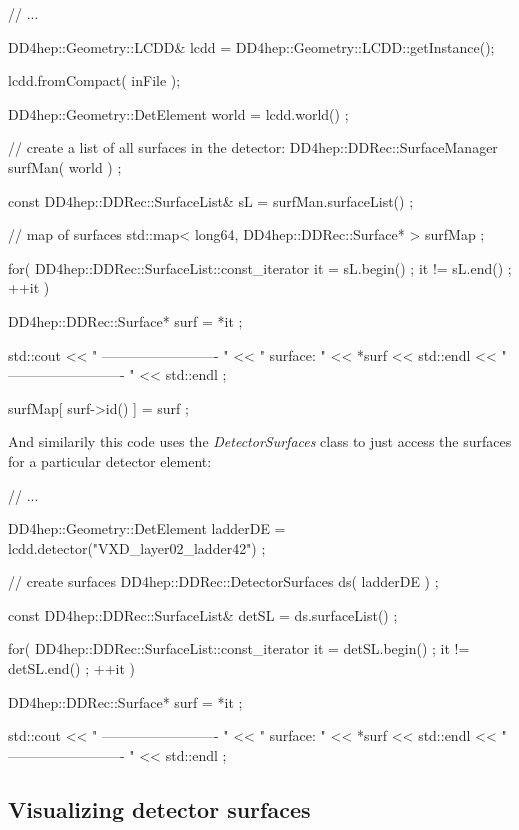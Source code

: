 \documentclass[10pt,a4paper]{article}
\begin{document}
\begin{code}
  // ...

  DD4hep::Geometry::LCDD& lcdd = DD4hep::Geometry::LCDD::getInstance();

  lcdd.fromCompact( inFile );

  DD4hep::Geometry::DetElement world = lcdd.world() ;

  // create a list of all surfaces in the detector:
  DD4hep::DDRec::SurfaceManager surfMan(  world ) ;

  const DD4hep::DDRec::SurfaceList& sL = surfMan.surfaceList() ;

  // map of surfaces
  std::map< long64, DD4hep::DDRec::Surface* > surfMap ;

  for( DD4hep::DDRec::SurfaceList::const_iterator it = sL.begin() ; it != sL.end() ; ++it ){
    
    DD4hep::DDRec::Surface* surf =  *it ;
    
    std::cout << " ------------------------- " 
      	      << " surface: "  << *surf         << std::endl
      	      << " ------------------------- "  << std::endl ;
    
    surfMap[ surf->id() ] = surf ;
  }

\end{code}

\noindent
And similarily this code uses the {\em DetectorSurfaces} class to just access the surfaces 
for a particular detector element:

\begin{code}
  // ...

  DD4hep::Geometry::DetElement ladderDE = lcdd.detector("VXD_layer02_ladder42") ;

  // create surfaces
  DD4hep::DDRec::DetectorSurfaces ds( ladderDE ) ;

  const DD4hep::DDRec::SurfaceList& detSL = ds.surfaceList() ;

  for( DD4hep::DDRec::SurfaceList::const_iterator it = detSL.begin() ; it != detSL.end() ; ++it ){

    DD4hep::DDRec::Surface* surf =  *it ;

    std::cout << " ------------------------- " 
      	      << " surface: "  << *surf         << std::endl
      	      << " ------------------------- "  << std::endl ;
  }
\end{code}

\subsection{Visualizing detector surfaces}
\label{subsec:ddrec-surfaces-visualization}
\end{document}
